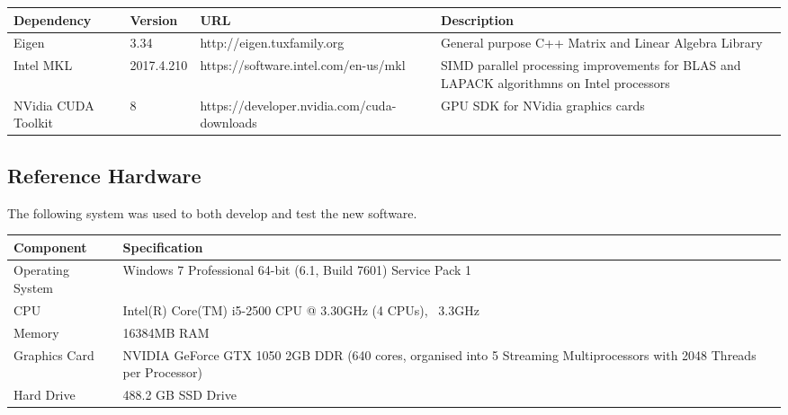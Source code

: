 \documentclass[a4paper]{amsart}
\begin{document}
 \begin{center}
 \begin{tabular}{|p{2cm}|p{2cm}|p{4cm}|p{4cm}|} 
 \hline
 Dependency & Version & URL & Description \\ [0.5ex] 
 \hline\hline
 Eigen\label{Eigen} & 3.34 &  http://eigen.tuxfamily.org & General purpose C++ Matrix and Linear Algebra Library \\ 
 \hline
 Intel MKL & 2017.4.210 & https://software.intel.com/en-us/mkl & SIMD parallel processing improvements for BLAS and LAPACK algorithmns on Intel processors \\
 \hline
NVidia CUDA Toolkit & 8 & https://developer.nvidia.com/cuda-downloads & GPU SDK for NVidia graphics cards  \\ [1ex] 
 \hline
\end{tabular}
\end{center}


\subsection{Reference Hardware}\label{refH}

The following system was used to both develop and test the new software.\\
 \begin{center}
 \begin{tabular}{|p{2cm}|p{8cm}|} 
 \hline
Component & Specification \\ [0.5ex] 
 \hline\hline
Operating System & Windows 7 Professional 64-bit (6.1, Build 7601) Service Pack 1 \\ 
 \hline
CPU & Intel(R) Core(TM) i5-2500 CPU @ 3.30GHz (4 CPUs), ~3.3GHz \\
 \hline
Memory & 16384MB RAM  \\ 
 \hline
Graphics Card & NVIDIA GeForce GTX 1050 2GB DDR (640 cores, organised into 5 Streaming Multiprocessors with 2048 Threads per Processor)  \\ 
 \hline
Hard Drive & 488.2 GB SSD Drive  \\ [1ex] 
 \hline
\end{tabular}
\end{center}
\end{document}
